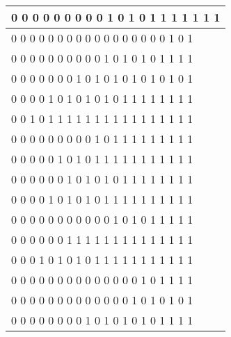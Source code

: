 \documentclass[11pt, a4paper]{article}
\begin{document}
\begin{enumerate}
\begin{table}[http]
\begin{tabular}{|l|}
			0     0     0     0     0     0     0     0     0     1     0     1     0     1     1     1     1     1     1     1 \\ \hline
			0     0     0     0     0     0     0     0     0     0     0     0     0     0     0     0     0     1     0     1 \\ \hline
			0     0     0     0     0     0     0     0     0     0     1     0     1     0     1     0     1     1     1     1 \\ \hline
			0     0     0     0     0     0     0     1     0     1     0     1     0     1     0     1     0     1     0     1 \\ \hline
			0     0     0     0     1     0     1     0     1     0     1     0     1     1     1     1     1     1     1     1 \\ \hline
			0     0     1     0     1     1     1     1     1     1     1     1     1     1     1     1     1     1     1     1 \\ \hline
			0     0     0     0     0     0     0     0     0     1     0     1     1     1     1     1     1     1     1     1 \\ \hline
			0     0     0     0     0     1     0     1     0     1     1     1     1     1     1     1     1     1     1     1 \\ \hline
			0     0     0     0     0     0     1     0     1     0     1     0     1     1     1     1     1     1     1     1 \\ \hline
			0     0     0     0     1     0     1     0     1     0     1     1     1     1     1     1     1     1     1     1 \\ \hline
			0     0     0     0     0     0     0     0     0     0     0     1     0     1     0     1     1     1     1     1 \\ \hline
			0     0     0     0     0     0     1     1     1     1     1     1     1     1     1     1     1     1     1     1 \\ \hline
			0     0     0     1     0     1     0     1     0     1     1     1     1     1     1     1     1     1     1     1 \\ \hline
			0     0     0     0     0     0     0     0     0     0     0     0     0     0     1     0     1     1     1     1 \\ \hline
			0     0     0     0     0     0     0     0     0     0     0     0     0     1     0     1     0     1     0     1 \\ \hline
			0     0     0     0     0     0     0     0     1     0     1     0     1     0     1     0     1     1     1     1 \\ \hline

\end{tabular}
\end{table}
\end{enumerate}
\end{document}

